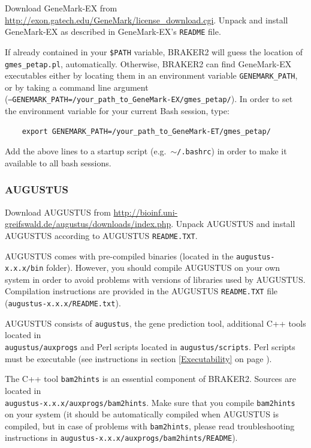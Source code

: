 \documentclass[a4paper,10pt]{report}
\begin{document}
Download GeneMark-EX from \url{http://exon.gatech.edu/GeneMark/license_download.cgi}.
 Unpack and install GeneMark-EX as described in GeneMark-EX's \texttt{README} file.

If already contained in your \texttt{\$PATH} variable, BRAKER2 will guess the location of \texttt{gmes\_petap.pl}, automatically. Otherwise, BRAKER2 can find GeneMark-EX executables either by locating them in an environment variable \texttt{GENEMARK\_PATH}, or by taking a command line argument\\ (\texttt{--GENEMARK\_PATH=/your\_path\_to\_GeneMark-EX/gmes\_petap/}). In order to set the environment variable for your current Bash session, type: 

    \begin{verbatim}
    export GENEMARK_PATH=/your_path_to_GeneMark-ET/gmes_petap/
\end{verbatim}

Add the above lines to a startup script (e.g.~\texttt{$\sim$/.bashrc}) in order to make it available to all bash sessions.

\subsubsection{AUGUSTUS}

Download AUGUSTUS from \url{http://bioinf.uni-greifswald.de/augustus/downloads/index.php}.
 Unpack AUGUSTUS and install AUGUSTUS  according to AUGUSTUS \texttt{README.TXT}. 
 
 AUGUSTUS comes with pre-compiled binaries (located in the 
   \texttt{augustus-x.x.x/bin} folder). However, you should compile AUGUSTUS on your own system in order to avoid problems with versions of libraries used by AUGUSTUS. Compilation instructions are provided in the AUGUSTUS \texttt{README.TXT} file
   (\texttt{augustus-x.x.x/README.txt}).

AUGUSTUS consists of \texttt{augustus}, the gene prediction tool, additional C++ tools located in\\ \texttt{augustus/auxprogs} and Perl scripts located in \texttt{augustus/scripts}. Perl scripts must be executable (see instructions in section \ref{Executability} on page \pageref{Executability}). 
   
   The C++ tool \texttt{bam2hints} is an essential component of BRAKER2. Sources are located in \\\texttt{augustus-x.x.x/auxprogs/bam2hints}. Make sure that you compile \texttt{bam2hints} on your system (it should be automatically compiled when AUGUSTUS is compiled, but in case of problems with \texttt{bam2hints}, please read troubleshooting instructions in 
   \texttt{augustus-x.x.x/auxprogs/bam2hints/README}).
   
\end{document}
